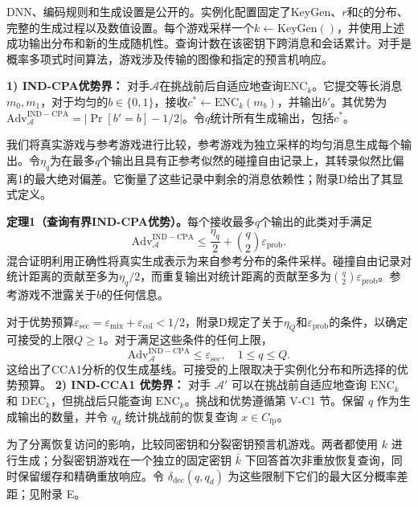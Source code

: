 DNN、编码规则和生成设置是公开的。实例化配置固定了KeyGen、\(r\)和\(\xi\)的分布、完整的生成过程以及数值设置。每个游戏采样一个\(k \leftarrow \mathrm{KeyGen}()\)，并使用上述成功输出分布和新的生成随机性。查询计数在该密钥下跨消息和会话累计。对手是概率多项式时间算法，游戏涉及传输的图像和指定的预言机响应。

\textbf{1) IND-CPA优势界：} 对手\(\mathcal{A}\)在挑战前后自适应地查询\(\mathrm{ENC}_k\)。它提交等长消息\(m_0, m_1\)，对于均匀的\(b \in \{0,1\}\)，接收\(c^* \leftarrow \mathrm{ENC}_k(m_b)\)，并输出\(b'\)。其优势为\(\mathrm{Adv}_{\mathcal{A}}^{\mathrm{IND-CPA}} = |\Pr[b' = b] - 1/2|\)。令\(q\)统计所有生成输出，包括\(c^*\)。

我们将真实游戏与参考游戏进行比较，参考游戏为独立采样的均匀消息生成每个输出。令\(\eta_q\)为在最多\(q\)个输出且具有正参考似然的碰撞自由记录上，其转录似然比偏离1的最大绝对偏差。它衡量了这些记录中剩余的消息依赖性；附录D给出了其显式定义。

\textbf{定理1（查询有界IND-CPA优势）。}每个接收最多\(q\)个输出的此类对手满足
\begin{equation}
\mathrm{Adv}_{\mathcal{A}}^{\mathrm{IND-CPA}} \le \frac{\eta_q}{2} + \binom{q}{2} \varepsilon_{\mathrm{prob}}. \tag{17}
\end{equation}
混合证明利用正确性将真实生成表示为来自参考分布的条件采样。碰撞自由记录对统计距离的贡献至多为\(\eta_q/2\)，而重复输出对统计距离的贡献至多为\(\binom{q}{2}\varepsilon_{\mathrm{prob}}\)。参考游戏不泄露关于\(b\)的任何信息。

对于优势预算\(\varepsilon_{\mathrm{sec}} = \varepsilon_{\mathrm{mix}} + \varepsilon_{\mathrm{col}} < 1/2\)，附录D规定了关于\(\eta_Q\)和\(\varepsilon_{\mathrm{prob}}\)的条件，以确定可接受的上限\(Q \ge 1\)。对于满足这些条件的任何上限，
\begin{equation}
\mathrm{Adv}_{\mathcal{A}}^{\mathrm{IND-CPA}} \le \varepsilon_{\mathrm{sec}}, \quad 1 \le q \le Q. \tag{18}
\end{equation}
这给出了CCA1分析的仅生成基线。可接受的上限取决于实例化分布和所选择的优势预算。
\textbf{2) IND-CCA1 优势界：} 对手 \(\mathcal{A}'\) 可以在挑战前自适应地查询 \(\mathrm{ENC}_k\) 和 \(\mathrm{DEC}_k\)，但挑战后只能查询 \(\mathrm{ENC}_k\)。挑战和优势遵循第 V-C1 节。保留 \(q\) 作为生成输出的数量，并令 \(q_d\) 统计挑战前的恢复查询 \(x \in C_{\mathrm{fp}}\)。

为了分离恢复访问的影响，比较同密钥和分裂密钥预言机游戏。两者都使用 \(k\) 进行生成；分裂密钥游戏在一个独立的固定密钥 \(\bar{k}\) 下回答首次非重放恢复查询，同时保留缓存和精确重放响应。令 \(\delta_{\mathrm{dec}}(q, q_d)\) 为这些限制下它们的最大区分概率差距；见附录 E。

